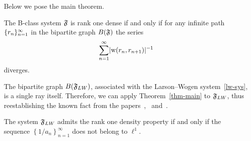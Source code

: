 \documentclass[12pt,oneside,a4paper]{amsart}
\begin{document}
    \bigskip
    Below we pose the main theorem.
    \begin{theorem}
      \label{thm-main}
      The B-class system $\mathfrak{F}$ is rank one dense if and only if
        for any infinite path $\{{r}_n\}_{n=1}^\infty$ in the bipartite graph $B(\mathfrak{F})$
        the series
        \[
          \sum_{n=1}^\infty\lvert\mathrm{w}(r_n, r_{n+1})\rvert^{-1}
        \]
        diverges.
    \end{theorem}
    The bipartite graph $B(\mathfrak{F}_{LW})$, associated with the Larson--Wogen system~\eqref{lw-sys},
      is a single ray itself.
    Therefore, we can apply Theorem~\ref{thm-main} to $\mathfrak{F}_{LW}$, thus reestablishing
      the known fact from the papers~\cite{katavolos},~\cite{larson} and~\cite{argyroslambrou}.
    \begin{corol*}
      The system $\mathfrak{F}_{LW}$ admits the rank one density property if and only if
        the sequence $\left\{1/a_n\right\}_{n=1}^\infty$ does not belong to $\ell^1$.
    \end{corol*}



\end{document}

